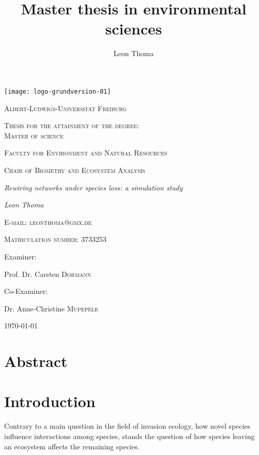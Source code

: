 \documentclass[12pt,a4paper]{article}
\author{Leon Thoma}
\title{Master thesis in environmental sciences}
\begin{document}
\begin{titlepage}
	\centering
	\texttt{[image: logo-grundversion-01]}\par\vspace{1cm}
	{\scshape\large Albert-Ludwigs-Universität Freiburg\par}
	\vspace{1.25cm}
	{\scshape\large Thesis for the attainment of the degree:\\ Master of science\par}
	\vspace{.75cm}
	{\scshape\large Faculty for Environment and Natural Resources\par}
	\vspace{.75cm}
	{\scshape\large Chair of Biometry and Ecosystem Analysis\par}
	\vspace{.75cm}
	{\Large\itshape Rewiring networks under species loss: a simulation
study
\par}
	\vspace{.75cm}
	{\Large\itshape Leon Thoma\par}
	\vspace{.25cm}
	{\scshape\normalsize E-mail: leonthoma@gmx.de\par}
	\vspace{.15cm}
	{\scshape\normalsize Matriculation number: 3733253\par}
	\vspace{.75cm}
	\large Examiner:\par
	\large Prof. Dr. Carsten  \textsc{Dormann} \par
	\vspace{.5cm}
	\large Co-Examiner:\par
	\large Dr. Anne-Christine \textsc{Mupepele}
	\vfill

	{\large \today\par}
\end{titlepage}
	\tableofcontents
	\newpage	
	\section{Abstract} 

\newpage%
%
%
\section{Introduction}
Contrary to a main question in the field of invasion ecology, how novel species influence interactions among species, stands the question of how species leaving an ecosystem affects the remaining species. 
\end{document}
